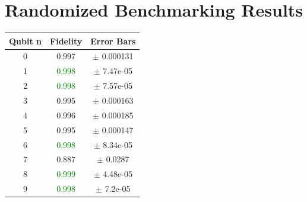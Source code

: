 \documentclass[9pt,a4paper]{src/templates/tau-class/tau}
\begin{document}
\section{Randomized Benchmarking Results}

\noindent\begin{minipage}{0.48\textwidth}
\noindent\begin{minipage}[t]{0.48\linewidth}
\begin{center}
\begin{tabular}{@{}c c c@{}}
\toprule
Qubit n & Fidelity & Error Bars \\ \midrule


0 & 0.997 & $\pm$ 0.000131 \\



1 & \textcolor{green}{0.998} & $\pm$ 7.47e-05 \\



2 & \textcolor{green}{0.998} & $\pm$ 7.57e-05 \\



3 & 0.995 & $\pm$ 0.000163 \\



4 & 0.996 & $\pm$ 0.000185 \\



5 & 0.995 & $\pm$ 0.000147 \\



6 & \textcolor{green}{0.998} & $\pm$ 8.34e-05 \\



7 & 0.887 & $\pm$ 0.0287 \\



8 & \textcolor{green}{0.999} & $\pm$ 4.48e-05 \\



9 & \textcolor{green}{0.998} & $\pm$ 7.2e-05 \\























\end{tabular}
\end{center}
\end{minipage}
\end{minipage}
\end{document}
